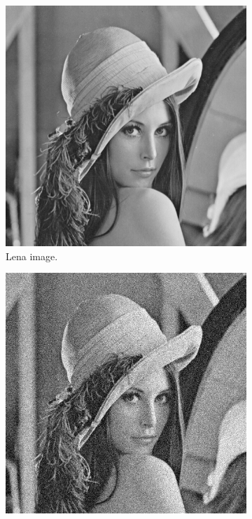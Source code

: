 \documentclass[abstracton]{scrreprt}
\begin{document}
        \begin{figure}[!ht]
                \centering
                \begin{subfigure}[b]{0.24\textwidth}
                    \includegraphics[width=\textwidth]{img/images/lena.png}
                    \caption{Lena image.}
                \end{subfigure}
                \begin{subfigure}[b]{0.24\textwidth}
                    \includegraphics[width=\textwidth]{img/images/lena_gauss_noise.png}

\end{subfigure}
\end{figure}
\end{document}
